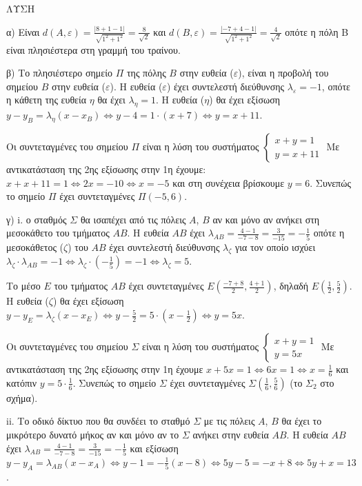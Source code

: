 ΛΥΣΗ

α) Είναι $d(A, \varepsilon)=\frac{|8+1-1|}{ \sqrt{1^2+1^2}}=\frac{8}{\sqrt{2}}$ και $d(B, \varepsilon)=\frac{|-7+4-1|}{\sqrt{1^2+1^2}}=\frac{4}{\sqrt{2}}$ οπότε η πόλη Β είναι πλησιέστερα στη γραμμή του τραίνου.

β) Το πλησιέστερο σημείο $\Pi$ της πόλης $B$ στην ευθεία ($\varepsilon$), είναι η προβολή του σημείου $B$ στην ευθεία ($\varepsilon$). Η ευθεία ($\varepsilon$) έχει συντελεστή διεύθυνσης $\lambda_\varepsilon=-1$, οπότε η κάθετη της ευθεία $\eta$ θα έχει $\lambda_\eta=1$. Η ευθεία ($\eta$) θα έχει εξίσωση $y-y_B=\lambda_\eta(x-x_B) \Leftrightarrow y-4=1 \cdot(x+7) \Leftrightarrow y=x+11$.

Οι συντεταγμένες του σημείου $\Pi$ είναι η λύση του συστήματος $\left\{\begin{array}{l}x+y=1 \\ y=x+11\end{array}\right.$
Με αντικατάσταση της 2ης εξίσωσης στην 1η έχουμε:
$x+x+11=1 \Leftrightarrow 2x=-10 \Leftrightarrow x=-5$ και στη συνέχεια βρίσκουμε $y=6$. Συνεπώς το σημείο $\Pi$ έχει συντεταγμένες $\Pi(-5,6)$.

γ)
i. ο σταθμός $\Sigma$ θα ισαπέχει από τις πόλεις $A$, $B$ αν και μόνο αν ανήκει στη μεσοκάθετο του τμήματος $AB$. Η ευθεία $AB$ έχει $\lambda_{AB}=\frac{4-1}{-7-8}=\frac{3}{-15}=-\frac{1}{5}$ οπότε η μεσοκάθετος ($\zeta$) του $AB$ έχει συντελεστή διεύθυνσης $\lambda_\zeta$ για τον οποίο ισχύει $\lambda_\zeta \cdot \lambda_{AB}=-1 \Leftrightarrow \lambda_\zeta \cdot\left(-\frac{1}{5}\right)=-1 \Leftrightarrow \lambda_\zeta=5$.

Το μέσο $E$ του τμήματος $AB$ έχει συντεταγμένες $E\left(\frac{-7+8}{2}, \frac{4+1}{2}\right)$, δηλαδή $E\left(\frac{1}{2}, \frac{5}{2}\right)$.
Η ευθεία ($\zeta$) θα έχει εξίσωση $y-y_E=\lambda_\zeta(x-x_E) \Leftrightarrow y-\frac{5}{2}=5 \cdot\left(x-\frac{1}{2}\right) \Leftrightarrow y=5x$.

Οι συντεταγμένες του σημείου $\Sigma$ είναι η λύση του συστήματος $\left\{\begin{array}{l}x+y=1 \\ y=5x\end{array}\right.$
Με αντικατάσταση της 2ης εξίσωσης στην 1η έχουμε $x+5x=1 \Leftrightarrow 6x=1 \Leftrightarrow x=\frac{1}{6}$ και κατόπιν $y=5 \cdot \frac{1}{6}$. Συνεπώς το σημείο $\Sigma$ έχει συντεταγμένες $\Sigma\left(\frac{1}{6}, \frac{5}{6}\right)$ (το $\Sigma_2$ στο σχήμα).

ii. Το οδικό δίκτυο που θα συνδέει το σταθμό $\Sigma$ με τις πόλεις $A$, $B$ θα έχει το μικρότερο δυνατό μήκος αν και μόνο αν το $\Sigma$ ανήκει στην ευθεία $AB$. Η ευθεία $AB$ έχει $\lambda_{AB}=\frac{4-1}{-7-8}=\frac{3}{-15}=-\frac{1}{5}$ και εξίσωση $y-y_A=\lambda_{AB}(x-x_A) \Leftrightarrow y-1=-\frac{1}{5}(x-8) \Leftrightarrow 5y-5=-x+8 \Leftrightarrow 5y+x=13$.

